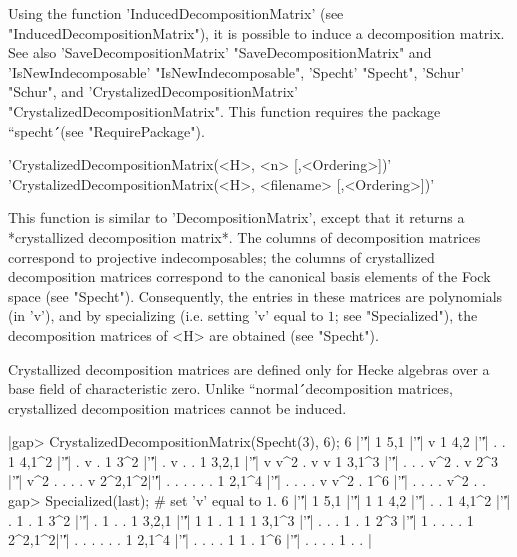 Using the function 'InducedDecompositionMatrix' (see 
"InducedDecompositionMatrix"), it is possible to induce a decomposition 
matrix. See also 'SaveDecompositionMatrix' "SaveDecompositionMatrix" and 
'IsNewIndecomposable' "IsNewIndecomposable", 'Specht' "Specht", 'Schur' 
"Schur", and 'CrystalizedDecompositionMatrix' "CrystalizedDecompositionMatrix". 
This function requires the package ``specht\'\'\ (see "RequirePackage").



'CrystalizedDecompositionMatrix(<H>, <n> [,<Ordering>])'\\
'CrystalizedDecompositionMatrix(<H>, <filename> [,<Ordering>])'

This function is similar to 'DecompositionMatrix', except that it 
returns a *crystallized decomposition matrix*. The columns of decomposition
matrices correspond to projective indecomposables; the columns of 
crystallized decomposition matrices correspond to the canonical basis 
elements of the Fock space (see "Specht"). Consequently, the entries in 
these matrices are polynomials (in 'v'), and by specializing (i.e. setting
'v' equal to $1$; see "Specialized"), the decomposition matrices of <H> 
are obtained (see "Specht").

Crystallized decomposition matrices are defined only for Hecke algebras 
over a base field of characteristic zero. Unlike ``normal\'\'\ 
decomposition matrices, crystallized decomposition matrices cannot be 
induced.

|gap> CrystalizedDecompositionMatrix(Specht(3), 6);
6      |'\|'|   1                         
5,1    |'\|'|   v   1                     
4,2    |'\|'|   .   .   1                 
4,1^2  |'\|'|   .   v   .   1             
3^2    |'\|'|   .   v   .   .   1         
3,2,1  |'\|'|   v v^2   .   v   v   1     
3,1^3  |'\|'|   .   .   . v^2   .   v     
2^3    |'\|'| v^2   .   .   .   .   v     
2^2,1^2|'\|'|   .   .   .   .   .   .   1
2,1^4  |'\|'|   .   .   .   .   v v^2   . 
1^6    |'\|'|   .   .   .   . v^2   .   . 
gap> Specialized(last);   # set 'v' equal to $1$.
6      |'\|'| 1             
5,1    |'\|'| 1 1           
4,2    |'\|'| . . 1         
4,1^2  |'\|'| . 1 . 1       
3^2    |'\|'| . 1 . . 1     
3,2,1  |'\|'| 1 1 . 1 1 1   
3,1^3  |'\|'| . . . 1 . 1   
2^3    |'\|'| 1 . . . . 1   
2^2,1^2|'\|'| . . . . . . 1
2,1^4  |'\|'| . . . . 1 1 . 
1^6    |'\|'| . . . . 1 . . |

